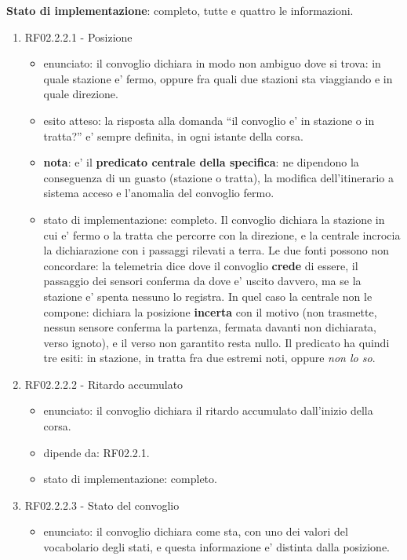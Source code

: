 \documentclass[11pt]{article}
\begin{document}
\textbf{Stato di implementazione}: completo, tutte e quattro le informazioni.
\begin{enumerate}
\item RF02.2.2.1 - Posizione
\label{sec:org7a4ce6b}
\begin{itemize}
\item enunciato: il convoglio dichiara in modo non ambiguo dove si trova: in quale stazione e' fermo,
oppure fra quali due stazioni sta viaggiando e in quale direzione.
\item esito atteso: la risposta alla domanda ``il convoglio e' in stazione o in tratta?'' e' sempre
definita, in ogni istante della corsa.
\item \textbf{nota}: e' il \textbf{predicato centrale della specifica}: ne dipendono la conseguenza di un guasto
(stazione o tratta), la modifica dell'itinerario a sistema acceso e l'anomalia del convoglio fermo.
\item stato di implementazione: completo. Il convoglio dichiara la stazione in cui e' fermo o la tratta
che percorre con la direzione, e la centrale incrocia la dichiarazione con i passaggi rilevati a
terra. Le due fonti possono non concordare: la telemetria dice dove il convoglio \textbf{crede} di
essere, il passaggio dei sensori conferma da dove e' uscito davvero, ma se la stazione e' spenta
nessuno lo registra. In quel caso la centrale non le compone: dichiara la posizione \textbf{incerta} con
il motivo (non trasmette, nessun sensore conferma la partenza, fermata davanti non dichiarata,
verso ignoto), e il verso non garantito resta nullo. Il predicato ha quindi tre esiti: in
stazione, in tratta fra due estremi noti, oppure \emph{non lo so}.
\end{itemize}
\item RF02.2.2.2 - Ritardo accumulato
\label{sec:org1cd5c4f}
\begin{itemize}
\item enunciato: il convoglio dichiara il ritardo accumulato dall'inizio della corsa.
\item dipende da: RF02.2.1.
\item stato di implementazione: completo.
\end{itemize}
\item RF02.2.2.3 - Stato del convoglio
\label{sec:org9419267}
\begin{itemize}
\item enunciato: il convoglio dichiara come sta, con uno dei valori del vocabolario degli stati, e questa
informazione e' distinta dalla posizione.

\end{itemize}
\end{enumerate}
\end{document}
